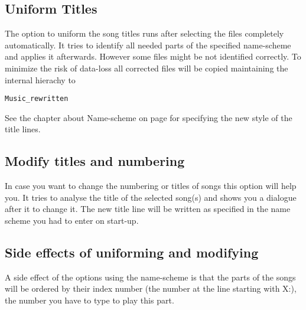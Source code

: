 \documentclass[10pt,a4paper,oneside]{article}
\begin{document}
\subsection{Uniform Titles}
The option to uniform the song titles runs after selecting the files completely automatically. It tries to identify all needed parts of the specified name-scheme and applies it afterwards. However some files might be not identified correctly. To minimize the risk of data-loss all corrected files will be copied maintaining the internal hierachy to \begin{verbatim} 
Music_rewritten
\end{verbatim} See the chapter about Name-scheme on page \pageref{name-scheme} for specifying the new style of the title lines.

\subsection{Modify titles and numbering}
In case you want to change the numbering or titles of songs this option will help you. It tries to analyse the title of the selected song(s) and shows you a dialogue after it to change it. The new title line will be written as specified in the name scheme you had to enter on start-up.

\subsection{Side effects of uniforming and modifying}
A side effect of the options using the name-scheme is that the parts of the songs will be ordered by their index number (the number at the line starting with X:), the number you have to type to play this part.
\end{document}
